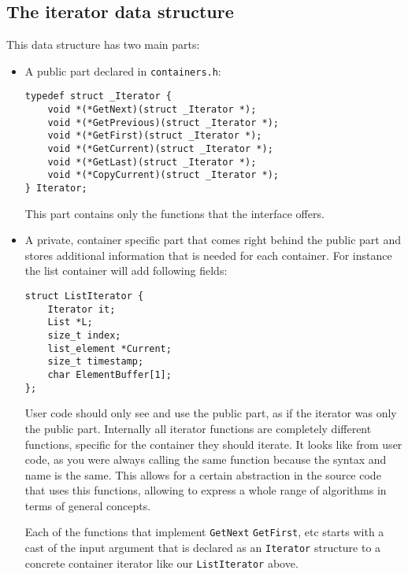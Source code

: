 \documentclass[12pt,a4paper]{memoir} %
\begin{document}
{{\subsection{The iterator data structure}
This data structure has two main parts:
\begin{itemize}
\item A public part declared in \texttt{containers.h}:
\begin{verbatim}
typedef struct _Iterator {
    void *(*GetNext)(struct _Iterator *);
    void *(*GetPrevious)(struct _Iterator *);
    void *(*GetFirst)(struct _Iterator *);
    void *(*GetCurrent)(struct _Iterator *);
    void *(*GetLast)(struct _Iterator *);
    void *(*CopyCurrent)(struct _Iterator *);
} Iterator;
\end{verbatim} 
This part contains only the functions that the interface offers.
\item A private, container specific part that comes right behind the public part and stores additional information that is needed for each container. For instance the list container will add following fields:
\begin{verbatim}
struct ListIterator {
    Iterator it;
    List *L;
    size_t index;
    list_element *Current;
    size_t timestamp;
    char ElementBuffer[1];
};
\end{verbatim}
User code should only see and use the public part, as if the iterator was only the public part. Internally all iterator functions are completely different functions, specific for the container they should iterate. It looks like from user code, as you were always calling the same function because the syntax and name is the same. This allows for a certain abstraction in the source code that uses this functions, allowing to express a whole range of algorithms in terms of general concepts.

Each of the functions that implement \texttt{GetNext} \texttt{GetFirst}, etc starts with a cast of the input argument that is declared as an \texttt{Iterator} structure to a concrete container iterator like our \texttt{ListIterator} above.


\end{itemize}}}
\end{document}
